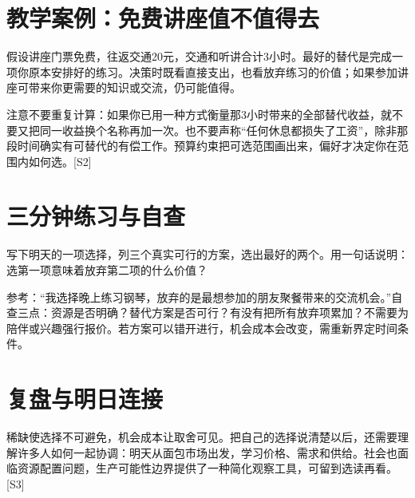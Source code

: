 \documentclass[11pt]{article}
\newcommand{\Needspace}[1]{\par\ifdim\dimexpr\pagegoal-\pagetotal\relax<#1\relax\newpage\fi}
\begin{document}
\Needspace{5\baselineskip}\section*{教学案例：免费讲座值不值得去}

假设讲座门票免费，往返交通20元，交通和听讲合计3小时。最好的替代是完成一项你原本安排好的练习。决策时既看直接支出，也看放弃练习的价值；如果参加讲座可带来你更需要的知识或交流，仍可能值得。

注意不要重复计算：如果你已用一种方式衡量那3小时带来的全部替代收益，就不要又把同一收益换个名称再加一次。也不要声称“任何休息都损失了工资”，除非那段时间确实有可替代的有偿工作。预算约束把可选范围画出来，偏好才决定你在范围内如何选。[S2]

\Needspace{5\baselineskip}\section*{三分钟练习与自查}

写下明天的一项选择，列三个真实可行的方案，选出最好的两个。用一句话说明：选第一项意味着放弃第二项的什么价值？

参考：“我选择晚上练习钢琴，放弃的是最想参加的朋友聚餐带来的交流机会。”自查三点：资源是否明确？替代方案是否可行？有没有把所有放弃项累加？不需要为陪伴或兴趣强行报价。若方案可以错开进行，机会成本会改变，需重新界定时间条件。

\Needspace{5\baselineskip}\section*{复盘与明日连接}

稀缺使选择不可避免，机会成本让取舍可见。把自己的选择说清楚以后，还需要理解许多人如何一起协调：明天从面包市场出发，学习价格、需求和供给。社会也面临资源配置问题，生产可能性边界提供了一种简化观察工具，可留到选读再看。[S3]
\end{document}
